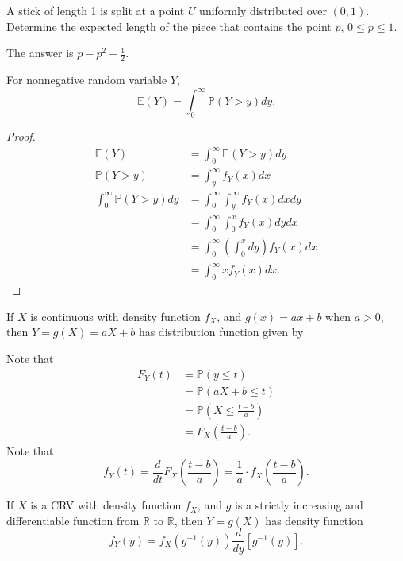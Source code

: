 \begin{eg}
	A stick of length 1 is split at a point \( U \) uniformly distributed over \( (0,1) \). Determine the expected length of the piece that contains the point \( p \), \( 0\le p\le 1 \).
\end{eg}
\begin{explanation}
	The answer is \( p - p^{2} + \frac{1}{2}  \).
\end{explanation}

\begin{lemma}
	For nonnegative random variable \( Y \), \[
		\mathbb{E}(Y) = \int_{0}^{\infty}\mathbb{P}(Y>y)dy 
	.\] 
\end{lemma}
\begin{proof}
	\begin{align*}
		\mathbb{E}(Y) &= \int_{0}^{\infty}\mathbb{P}(Y>y)  dy\\
		\mathbb{P}(Y>y) &=  \int_{y}^{\infty}f_Y(x)dx  \\
		\int_{0}^{\infty} \mathbb{P}(Y>y) dy &= \int_{0}^{\infty}\int_{y}^{\infty}f_Y(x)dxdy   \\
		&= \int_{0}^{\infty}\int_{0}^{x} f_Y(x)dy dx   \\
		&= \int_{0}^{\infty} \left(\int_{0}^{x} dy \right) f_Y(x) dx  \\
		&= \int_{0}^{\infty} x f_Y(x) dx 
	.\end{align*}
\end{proof}

\begin{eg}
	If \( X \) is continuous with density function \( f_X \), and \( g(x) = ax + b \) when \( a>0 \), then \( Y=g(X) = aX + b \) has distribution function given by
\end{eg}
\begin{explanation}
	Note that 
	\begin{align*}
		F_Y(t) &= \mathbb{P}(y\le t) \\
		&= \mathbb{P}(aX + b \le t) \\
		&= \mathbb{P}\left(X \le \frac{t-b}{a}\right) \\
		&= F_X\left(\frac{t-b}{a}\right) 
	.\end{align*}
	Note that \[
		f_Y(t) = \frac{d}{dt} F_X \left( \frac{t-b}{a} \right)  = \frac{1}{a} \cdot f_X\left(\frac{t-b}{a}\right)
	.\] 
\end{explanation}

\begin{theorem}
	If \( X  \) is a CRV with density function \( f_X \), and \( g \) is a strictly increasing and differentiable function from \( \mathbb{R} \) to \( \mathbb{R} \), then \( Y = g(X) \) has density function \[
		f_Y(y) = f_X(g^{-1}(y))\frac{d}{dy}[g^{-1}(y)]
	.\] 
\end{theorem}
